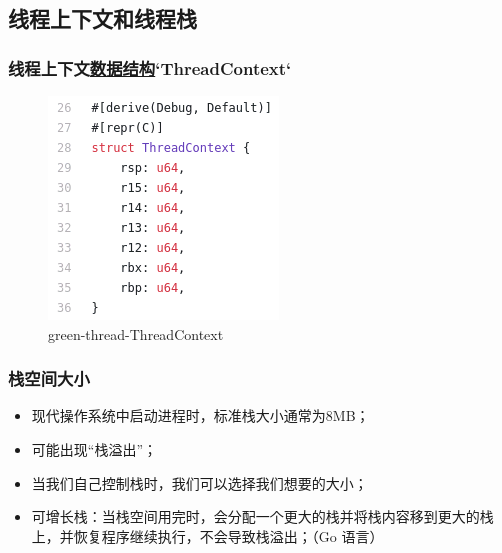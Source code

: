 \subsection{线程上下文和线程栈}
\begin{frame}[fragile]
    \frametitle{线程上下文\href{https://github.com/cfsamson/example-greenthreads/blob/master/src/main.rs\#L28}{数据结构}`ThreadContext`}
% 
	\begin{figure}
		\centering
		\includegraphics[width=0.5\linewidth]{figs/green-thread-ThreadContext.png}
		\caption{green-thread-ThreadContext}
	\end{figure}


% 
\end{frame}
\begin{frame}[fragile]
    \frametitle{栈空间大小}
    \begin{itemize}
        \item 现代操作系统中启动进程时，标准栈大小通常为8MB；
        \item 可能出现“栈溢出”；
        \item 当我们自己控制栈时，我们可以选择我们想要的大小；
        \item 可增长栈：当栈空间用完时，会分配一个更大的栈并将栈内容移到更大的栈上，并恢复程序继续执行，不会导致栈溢出；（Go 语言）
    \end{itemize}
% 
% 
% 
\end{frame}
